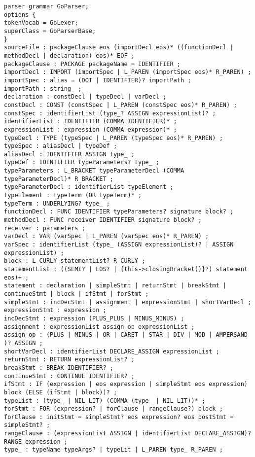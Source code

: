 \begin{lstlisting}[basicstyle=\scriptsize,caption={Описание синтаксического анализатора}]
parser grammar GoParser;
options {
tokenVocab = GoLexer;
superClass = GoParserBase;
}
sourceFile : packageClause eos (importDecl eos)* ((functionDecl | methodDecl | declaration) eos)* EOF ;
packageClause : PACKAGE packageName = IDENTIFIER ;
importDecl : IMPORT (importSpec | L_PAREN (importSpec eos)* R_PAREN) ;
importSpec : alias = (DOT | IDENTIFIER)? importPath ;
importPath : string_ ;
declaration : constDecl | typeDecl | varDecl ;
constDecl : CONST (constSpec | L_PAREN (constSpec eos)* R_PAREN) ;
constSpec : identifierList (type_? ASSIGN expressionList)? ;
identifierList : IDENTIFIER (COMMA IDENTIFIER)* ;
expressionList : expression (COMMA expression)* ;
typeDecl : TYPE (typeSpec | L_PAREN (typeSpec eos)* R_PAREN) ;
typeSpec : aliasDecl | typeDef ;
aliasDecl : IDENTIFIER ASSIGN type_ ;
typeDef : IDENTIFIER typeParameters? type_ ;
typeParameters : L_BRACKET typeParameterDecl (COMMA typeParameterDecl)* R_BRACKET ;
typeParameterDecl : identifierList typeElement ;
typeElement : typeTerm (OR typeTerm)* ;
typeTerm : UNDERLYING? type_ ;
functionDecl : FUNC IDENTIFIER typeParameters? signature block? ;
methodDecl : FUNC receiver IDENTIFIER signature block? ;
receiver : parameters ;
varDecl : VAR (varSpec | L_PAREN (varSpec eos)* R_PAREN) ;
varSpec : identifierList (type_ (ASSIGN expressionList)? | ASSIGN expressionList) ;
block : L_CURLY statementList? R_CURLY ;
statementList : ((SEMI? | EOS? | {this->closingBracket()}?) statement eos)+ ;
statement : declaration | simpleStmt | returnStmt | breakStmt | continueStmt | block | ifStmt | forStmt ;
simpleStmt : incDecStmt | assignment | expressionStmt | shortVarDecl ;
expressionStmt : expression ;
incDecStmt : expression (PLUS_PLUS | MINUS_MINUS) ;
assignment : expressionList assign_op expressionList ;
assign_op : (PLUS | MINUS | OR | CARET | STAR | DIV | MOD | AMPERSAND )? ASSIGN ;
shortVarDecl : identifierList DECLARE_ASSIGN expressionList ;
returnStmt : RETURN expressionList? ;
breakStmt : BREAK IDENTIFIER? ;
continueStmt : CONTINUE IDENTIFIER? ;
ifStmt : IF (expression | eos expression | simpleStmt eos expression) block (ELSE (ifStmt | block))? ;
typeList : (type_ | NIL_LIT) (COMMA (type_ | NIL_LIT))* ;
forStmt : FOR (expression? | forClause | rangeClause?) block ;
forClause : initStmt = simpleStmt? eos expression? eos postStmt = simpleStmt? ;
rangeClause : (expressionList ASSIGN | identifierList DECLARE_ASSIGN)? RANGE expression ;
type_ : typeName typeArgs? | typeLit | L_PAREN type_ R_PAREN ;

\end{lstlisting}
